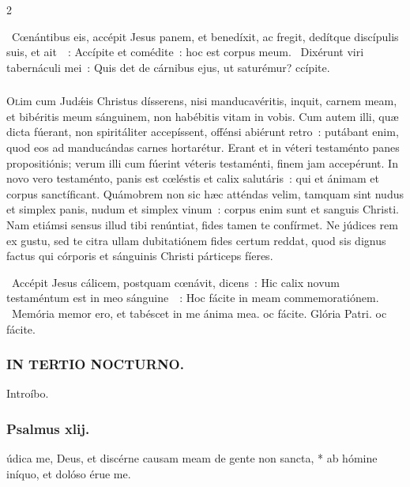 \documentclass[9pt,twoside]{extarticle}
\begin{document}
\begin{multicols}{2}
{\begin{tightlist}{}
\item {}~Cœnántibus eis, accépit Jesus panem, et benedíxit, ac fregit, dedítque discípulis suis, et ait~~: \textred{*} Accípite et comédite~: hoc est corpus meum. ~Dixérunt viri tabernáculi mei~: Quis det de cárnibus ejus, ut saturémur? ccípite.
\end{tightlist}

\subsubsection*{\center {}}
\lettrine{O}lim cum Judǽis Christus dísserens, nisi manducavéritis, inquit, carnem meam, et bibéritis meum sánguinem, non habébitis vitam in vobis. Cum autem illi, quæ dicta fúerant, non spiritáliter accepíssent, offénsi abiérunt retro~: putábant enim, quod eos ad manducándas carnes hortarétur. Erant et in véteri testaménto panes propositiónis; verum illi cum fúerint véteris testaménti, finem jam accepérunt. In novo vero testaménto, panis est cœléstis et calix salutáris~: qui et ánimam et corpus sanctíficant. Quámobrem non sic hæc atténdas velim, tamquam sint nudus et simplex panis, nudum et simplex vinum~: corpus enim sunt et sanguis Christi. Nam etiámsi sensus illud tibi renúntiat, fides tamen te confírmet. Ne júdices rem ex gustu, sed te citra ullam dubitatiónem fides certum reddat, quod sis dignus factus qui córporis et sánguinis Christi párticeps fíeres.

\begin{tightlist}{}
\item {}~Accépit Jesus cálicem, postquam cœnávit, dicens~: Hic calix novum testaméntum est in meo sánguine~~: \textred{*} Hoc fácite in meam commemoratiónem. ~Memória memor ero, et tabéscet in me ánima mea. oc fácite. Glória Patri. oc fácite.
\end{tightlist}

\subsubsection*{\center \textsc{IN TERTIO NOCTURNO.}}
\begin{tightlist}{}
\item {} Introíbo.
\end{tightlist}
\subsubsection*{\center Psalmus xlij.}
údica me, Deus, et discérne causam meam de gente non sancta, * ab hómine iníquo, et dolóso érue me.

}
\end{multicols}
\end{document}
